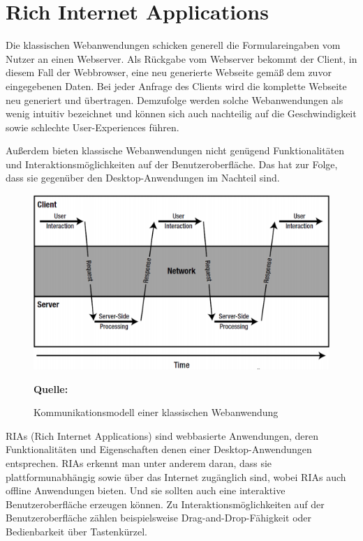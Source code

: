 \section{Rich Internet Applications}
\label{sec:rich internet applications}
Die klassischen Webanwendungen schicken generell die Formulareingaben vom Nutzer an einen Webserver. Als Rückgabe vom Webserver bekommt der Client, in diesem Fall der Webbrowser, eine neu generierte Webseite gemäß dem zuvor eingegebenen Daten. Bei jeder Anfrage des Clients wird die komplette Webseite neu generiert und übertragen. Demzufolge werden solche Webanwendungen als wenig intuitiv bezeichnet und können sich auch nachteilig auf die Geschwindigkeit sowie schlechte User-Experiences führen.\bigskip

Außerdem bieten klassische Webanwendungen nicht genügend Funktionalitäten und Interaktionsmöglichkeiten auf der Benutzeroberfläche. Das hat zur Folge, dass sie gegenüber den Desktop-Anwendungen im Nachteil sind.

\begin{figure}[H]
  \begin{center}
    \includegraphics[scale=0.6]{img/clientServerKommunikation}
	\caption{Kommunikationsmodell einer klassischen Webanwendung}
	\footnotesize\sffamily\textbf{Quelle:} \cite{Ban2008a}  
	\label{fig:lientServerKommunikation}
  \end{center}   
\end{figure}

RIAs (Rich Internet Applications) sind webbasierte Anwendungen, deren Funktionalitäten und Eigenschaften denen einer Desktop-Anwendungen entsprechen. RIAs erkennt man unter anderem daran, dass sie plattformunabhängig sowie über das Internet zugänglich sind, wobei RIAs auch offline Anwendungen bieten. Und sie sollten auch eine interaktive Benutzeroberfläche erzeugen können. Zu Interaktionsmöglichkeiten auf der Benutzeroberfläche zählen beispielsweise Drag-and-Drop-Fähigkeit oder Bedienbarkeit über Tastenkürzel.\bigskip

